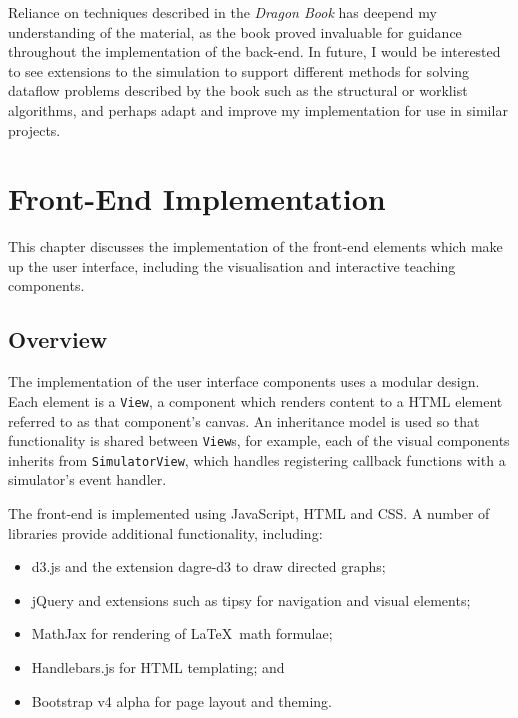 \documentclass[bsc,twoside,singlespacing,parskip,logo,notimes,normalheadings]{infthesis}
\begin{document}
        Reliance on techniques described in the {\em Dragon
          Book}\cite{dragonbook} has deepend my understanding of the
        material, as the book proved invaluable for guidance
        throughout the implementation of the back-end. In future, I
        would be interested to see extensions to the simulation to
        support different methods for solving \gls{dataflow} problems
        described by the book such as the structural or worklist
        algorithms, and perhaps adapt and improve my implementation
        for use in similar projects.

        

        

\chapter{Front-End Implementation}\label{chap:impl-frontend}
This chapter discusses the implementation of the front-end elements
which make up the user interface, including the visualisation and
interactive teaching components.

    \section{Overview}
    The implementation of the user interface components uses a modular
    design. Each element is a {\tt View}, a component which renders
    content to a HTML element referred to as that component's
    canvas. An inheritance model is used so that functionality is
    shared between {\tt View}s, for example, each of the visual
    components inherits from {\tt SimulatorView}, which handles
    registering callback functions with a simulator's event handler.

    The front-end is implemented using JavaScript, HTML and CSS. A
    number of libraries provide additional functionality, including:

    \begin{itemize}
    \item d3.js and the extension dagre-d3 to draw directed graphs;
    \item jQuery and extensions such as tipsy for navigation and
      visual elements;
    \item MathJax for rendering of \LaTeX\ math formulae;
    \item Handlebars.js for HTML templating; and
    \item Bootstrap v4 alpha for page layout and theming.
    \end{itemize}
\end{document}
